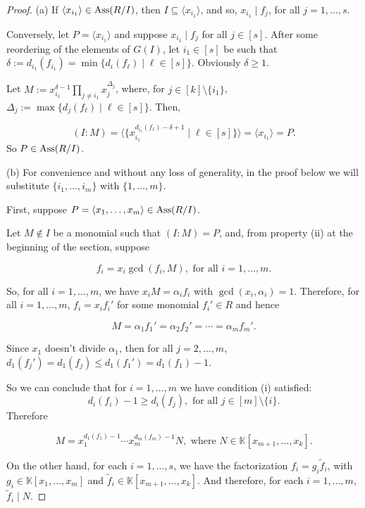 \documentclass[11pt]{amsart}   %
\begin{document}
\begin{proof} (a) If $\langle x_{i_1}\rangle\in {\rm Ass}(R/I)$, then $I\subseteq \langle x_{i_1}\rangle$, and so, $x_{i_1}\mid f_j$, for all $j=1,\ldots,s$.

Conversely, let $P=\langle x_{i_1}\rangle$ and suppose $x_{i_1}\mid f_j$ for all $j\in[s]$. After some reordering of the elements of $G(I)$, let $i_1\in[s]$ be such that $\delta:=d_{i_1}(f_{i_1})=\min\{d_i(f_{\ell})\mid \ell\in[s]\}$. Obviously $\delta\geq 1$. 

Let $\displaystyle M:=x_{i_1}^{\delta-1}\prod_{j\neq i_1}x_j^{\Delta_j}$, where, for $j\in[k]\setminus\{i_1\}$, $\Delta_j:=\max\{d_j(f_\ell)\mid\ell\in[s]\}$. Then,

$$(I:M)=\langle \{x_{i_1}^{d_{i_1}(f_{\ell})-\delta+1}\mid \ell\in[s]\}\rangle=\langle x_{i_1}\rangle=P.$$ So $P\in {\rm Ass}(R/I)$.

\medskip

(b) For convenience and without any loss of generality, in the proof below we will substitute $\{i_1,\ldots,i_m\}$ with $\{1,\ldots,m\}$.

\medskip

First, suppose $P=\langle x_1,\ldots,x_m\rangle\in{\rm Ass}(R/I)$.

Let $M\notin I$ be a monomial such that $(I:M)=P$, and, from property (ii) at the beginning of the section, suppose

$$f_i=x_i\gcd(f_i,M), \mbox{ for all } i=1,\ldots,m.$$

So, for all $i=1,\ldots,m$, we have $x_iM=\alpha_if_i$ with $\gcd(x_i,\alpha_i)=1$. Therefore, for all $i=1,\ldots,m$, $f_i=x_if_i'$ for some monomial $f_i'\in R$ and hence

$$M=\alpha_1f_1'=\alpha_2f_2'=\cdots=\alpha_mf_m'.$$

Since $x_1$ doesn't divide $\alpha_1$, then for all $j=2,\ldots,m$, $d_1(f_j')=d_1(f_j)\leq d_1(f_1')=d_1(f_1)-1$.

So we can conclude that for $i=1,\ldots,m$ we have condition (i) satisfied: $$d_i(f_i)-1\geq d_i(f_j), \mbox{ for all } j\in[m]\setminus\{i\}.$$ Therefore

$$M=x_1^{d_1(f_1)-1}\cdots x_m^{d_m(f_m)-1}N, \mbox{ where } N\in\mathbb K[x_{m+1},\ldots,x_k].$$

On the other hand, for each $i=1,\ldots,s$, we have the factorization $f_i=g_i\tilde{f}_i$, with $g_i\in\mathbb K[x_1,\ldots,x_m]$ and $\tilde{f}_i\in\mathbb K[x_{m+1},\ldots,x_k]$. And therefore, for each $i=1,\ldots,m$, $\tilde{f}_i\mid N$.


\end{proof}
\end{document}
